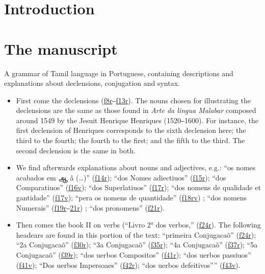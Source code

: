 \documentclass[12pt,a4paper]{scrbook}
\begin{document}
\newpage

\tableofcontents

\part{Introduction}
    
\part{The manuscript}
\newpage
    
              

A grammar of Tamil language in Portuguese, containing descriptions and explanations about declensions, conjugation and syntax.
                     
\begin{itemize}
    
\item First come the declensions (\hyperlink{img-25}{f8r}‒\hyperlink{img-35}{f13r}). The nouns chosen for illustrating the declensions are the same as those found in \emph{Arte da lingua Malabar} composed around 1549 by the Jesuit Henrique Henriques (1520‒1600). For instance, the first declension of Henriques corresponds to the sixth declension here; the third to the fourth; the fourth to the first; and the fifth to the third. The second declension is the same in both.
    
\item We find afterwards explanations about nouns and adjectives, e.g.: “os nomes acabados em ஆ â (…)” (\hyperlink{img-37}{f14r}); “dos Nomes adiectiuos” (\hyperlink{img-39}{f15r}); “dos Comparatiuos” (\hyperlink{img-41}{f16v}); “dos Superlatiuos” (\hyperlink{img-43}{f17r}); “dos nomens de qualidade et gantidade” (\hyperlink{img-44}{f17v}); “pera os nomens de quantidade” (\hyperlink{img-45}{f18r}\hyperlink{img-46}{v}) ; “dos nomens Numerais” (\hyperlink{img-47}{f19r}‒\hyperlink{img-51}{21r}) ; “dos pronomens” (\hyperlink{img-51}{f21r}).
    
\item Then comes the book II on verbs (“Livro 2° dos verbos,” (\hyperlink{img-57}{f24r}). The following headears are found in this portion of the text: “primeira Conjugacaõ” (\hyperlink{img-57}{f24r}); “2a Conjugacaõ” (\hyperlink{img-69}{f30r}); “3a Conjugacaõ” (\hyperlink{img-79}{f35r}); “4a Conjugacaõ” (\hyperlink{img-83}{f37r}); “5a Conjugacaõ” (\hyperlink{img-87}{f39r}); “dos uerbos Compositos” (\hyperlink{img-91}{f41r}); “dos uerbos passiuos” (\hyperlink{img-91}{f41v}); “Dos uerbos Impersoaes” (\hyperlink{img-93}{f42r}); “dos uerbos defeitivos”” (\hyperlink{img-96}{f43v}).
    

\end{itemize}
\end{document}

